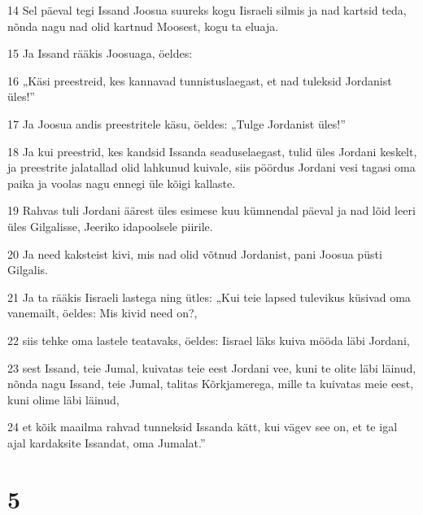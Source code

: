 \par 14 Sel päeval tegi Issand Joosua suureks kogu Iisraeli silmis ja nad kartsid teda, nõnda nagu nad olid kartnud Moosest, kogu ta eluaja.
\par 15 Ja Issand rääkis Joosuaga, öeldes:
\par 16 „Käsi preestreid, kes kannavad tunnistuslaegast, et nad tuleksid Jordanist üles!”
\par 17 Ja Joosua andis preestritele käsu, öeldes: „Tulge Jordanist üles!”
\par 18 Ja kui preestrid, kes kandsid Issanda seaduselaegast, tulid üles Jordani keskelt, ja preestrite jalatallad olid lahkunud kuivale, siis pöördus Jordani vesi tagasi oma paika ja voolas nagu ennegi üle kõigi kallaste.
\par 19 Rahvas tuli Jordani äärest üles esimese kuu kümnendal päeval ja nad lõid leeri üles Gilgalisse, Jeeriko idapoolsele piirile.
\par 20 Ja need kaksteist kivi, mis nad olid võtnud Jordanist, pani Joosua püsti Gilgalis.
\par 21 Ja ta rääkis Iisraeli lastega ning ütles: „Kui teie lapsed tulevikus küsivad oma vanemailt, öeldes: Mis kivid need on?,
\par 22 siis tehke oma lastele teatavaks, öeldes: Iisrael läks kuiva mööda läbi Jordani,
\par 23 sest Issand, teie Jumal, kuivatas teie eest Jordani vee, kuni te olite läbi läinud, nõnda nagu Issand, teie Jumal, talitas Kõrkjamerega, mille ta kuivatas meie eest, kuni olime läbi läinud,
\par 24 et kõik maailma rahvad tunneksid Issanda kätt, kui vägev see on, et te igal ajal kardaksite Issandat, oma Jumalat.”

\chapter{5}

